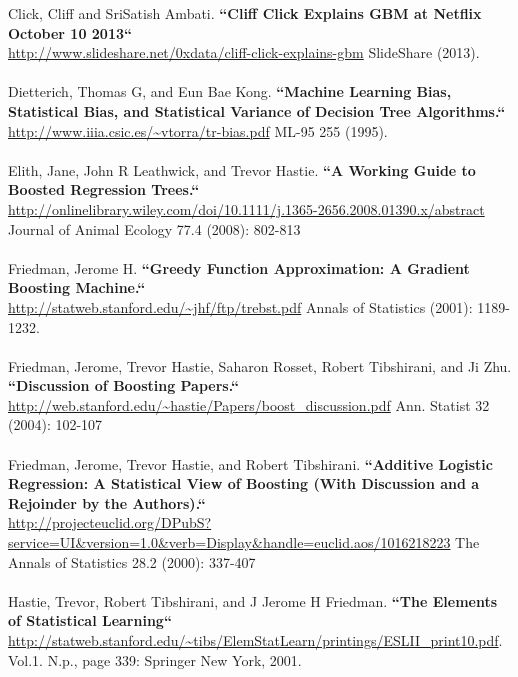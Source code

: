 Click, Cliff and SriSatish Ambati. {\textbf{``Cliff Click Explains GBM at Netflix October 10 2013``}}\\
 \url{http://www.slideshare.net/0xdata/cliff-click-explains-gbm} SlideShare (2013).
\\
\\
Dietterich, Thomas G, and Eun Bae Kong. {\textbf{``Machine Learning Bias, Statistical Bias, and Statistical Variance of Decision Tree Algorithms.``}} \\
\url{http://www.iiia.csic.es/~vtorra/tr-bias.pdf} ML-95 255 (1995).
\\
\\
Elith, Jane, John R Leathwick, and Trevor Hastie. {\textbf{``A Working Guide to Boosted Regression Trees.``}} \\\url{http://onlinelibrary.wiley.com/doi/10.1111/j.1365-2656.2008.01390.x/abstract} Journal of Animal Ecology 77.4 (2008): 802-813
\\
\\
Friedman, Jerome H. {\textbf{``Greedy Function Approximation: A Gradient Boosting Machine.``}}\\
 \url{http://statweb.stanford.edu/~jhf/ftp/trebst.pdf} Annals of Statistics (2001): 1189-1232.
\\
\\
Friedman, Jerome, Trevor Hastie, Saharon Rosset, Robert Tibshirani, and Ji Zhu. {\textbf{``Discussion of Boosting Papers.``}}\\
\url{http://web.stanford.edu/~hastie/Papers/boost_discussion.pdf} Ann. Statist 32 (2004): 102-107
\\
\\
Friedman, Jerome, Trevor Hastie, and Robert Tibshirani. {\textbf{``Additive Logistic Regression: A Statistical View of Boosting (With Discussion and a Rejoinder by the Authors).``}}\\
 \url{http://projecteuclid.org/DPubS?service=UI&version=1.0&verb=Display&handle=euclid.aos/1016218223} The Annals of Statistics 28.2 (2000): 337-407
\\
\\
Hastie, Trevor, Robert Tibshirani, and J Jerome H Friedman. {\textbf{``The Elements of Statistical Learning``}}\\
  \url{http://statweb.stanford.edu/~tibs/ElemStatLearn/printings/ESLII_print10.pdf}. Vol.1. N.p., page 339: Springer New York, 2001.
\\
\\





